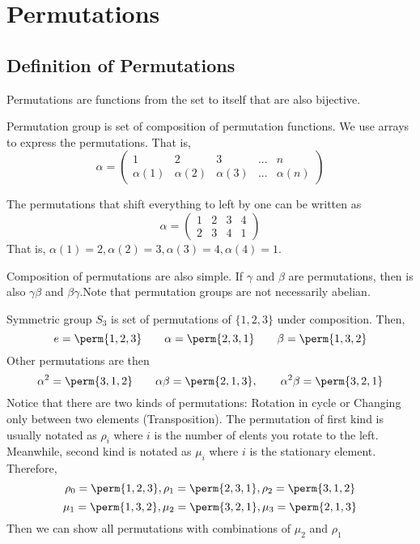 \chapter{Permutations}
\section{Definition of Permutations}
\begin{definition*}
    \alert{Permutations} are functions from the set to itself that are also bijective.
\end{definition*}
\alert{Permutation group} is set of composition of permutation functions.
We use arrays to express the permutations. That is,
\[ \alpha =
    \begin{pmatrix}
        1 & 2 & 3 & ... & n \\
        \alpha(1) & \alpha(2) & \alpha(3) & ... & \alpha(n)
    \end{pmatrix}
\]
\begin{example}
    The permutations that shift everything to left by one can be written as
    \[
        \alpha =
        \begin{pmatrix}
            1 & 2& 3 & 4 \\
            2 & 3 & 4 & 1
        \end{pmatrix}
    \]
    That is, $\alpha(1) = 2, \alpha(2) = 3, \alpha(3) = 4, \alpha(4) = 1$.
\end{example}
Composition of permutations are also simple. If $\gamma$ and $\beta$ are permutations, then is also $\gamma \beta$ and $\beta \gamma$.Note
that permutation groups are \alert{not necessarily abelian}.
\begin{example}
    Symmetric group $S_3$ is set of permutations of $\{ 1,2,3\}$ under composition. Then,
    \[ e = \perm{1,2,3}
        \qquad
        \alpha = \perm{2,3,1}
        \qquad
        \beta = \perm{1,3,2}
    \]
    Other permutations are then
    \[ \alpha ^2 = \perm{3,1,2}
        \qquad
        \alpha \beta = \perm{2,1,3},
        \qquad
        \alpha^2 \beta = \perm{3,2,1}
    \]
    Notice that there are two kinds of permutations: Rotation in cycle or Changing only between two elements (Transposition). The
    permutation of first kind is usually notated as $\rho_i$ where $i$ is the number of elents you rotate to the left. Meanwhile, second
    kind is notated as $\mu_i$ where $i$ is the stationary element.
    Therefore,
    \[ \rho_0 = \perm{1,2,3}, \rho_1 = \perm{2,3,1}, \rho_2 = \perm{3,1,2}\]
    \[ \mu_1 = \perm{1,3,2}, \mu_2 = \perm{3,2,1}, \mu_3 = \perm{2,1,3}\]
    Then we can show all permutations with combinations of $\mu_2$ and $\rho_1$
\end{example}
